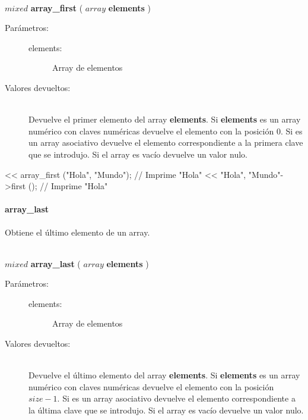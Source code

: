 \begin{framed}
\hfill \\ $mixed$ \textbf{array\_first} ( $array$ \textbf{elements} )  
\begin{description}
\item [Parámetros:] \hfill 
   \begin{description}
   \item[elements:] Array de elementos
   \end{description}
\item[Valores devueltos:] \hfill \\
   Devuelve el primer elemento del array \textbf{elements}. Si \textbf{elements} es un array
   numérico con claves numéricas devuelve el elemento con la posición 0. Si es un array asociativo 
   devuelve el elemento correspondiente a la primera clave que se introdujo. Si el array es vacío 
   devuelve un valor nulo. 
\end{description}
\end{framed}
     
\begin{myverbatim}   
   << array_first ({"Hola", "Mundo"}); // Imprime "Hola"
   << {"Hola", "Mundo"}->first (); // Imprime "Hola"
\end{myverbatim}

\paragraph{array\_last}
Obtiene el último elemento de un array. 

\begin{framed}
\hfill \\ $mixed$ \textbf{array\_last} ( $array$ \textbf{elements} )  
\begin{description}
\item [Parámetros:] \hfill 
   \begin{description}
   \item[elements:] Array de elementos
   \end{description}
\item[Valores devueltos:] \hfill \\
   Devuelve el último elemento del array \textbf{elements}. Si \textbf{elements} es un array
   numérico con claves numéricas devuelve el elemento con la posición $size - 1$. Si es un array asociativo 
   devuelve el elemento correspondiente a la última clave que se introdujo. Si el array es vacío 
   devuelve un valor nulo. 
\end{description}
\end{framed}
     
